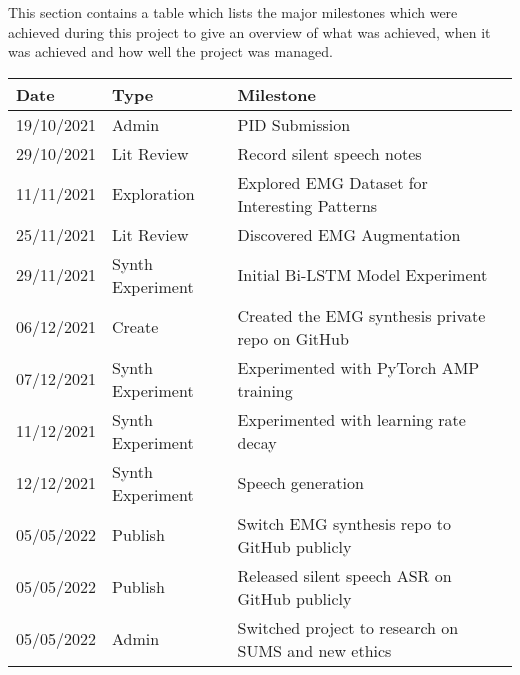 This section contains a table which lists the major milestones which were
achieved during this project to give an overview of what was achieved, when it was
achieved and how well the project was managed.

{\small\begin{center}
    \begin{tabularx}{\textwidth}{ l l l }
        Date & Type & Milestone \\
        \hline
        19/10/2021 & Admin & PID Submission \\
        29/10/2021 & Lit Review & Record silent speech notes \\
        11/11/2021 & Exploration & Explored EMG Dataset for Interesting Patterns \\
        25/11/2021 & Lit Review & Discovered EMG Augmentation \\
        29/11/2021 & Synth Experiment & Initial Bi-LSTM Model Experiment \\
        06/12/2021 & Create & Created the EMG synthesis private repo on GitHub \\
        07/12/2021 & Synth Experiment & Experimented with PyTorch AMP training \\
        11/12/2021 & Synth Experiment & Experimented with learning rate decay \\
        12/12/2021 & Synth Experiment & Speech generation \\
        05/05/2022 & Publish & Switch EMG synthesis repo to GitHub publicly \\
        05/05/2022 & Publish & Released silent speech ASR on GitHub publicly \\
        05/05/2022 & Admin & Switched project to research on SUMS and new ethics
    \end{tabularx}
\end{center}}